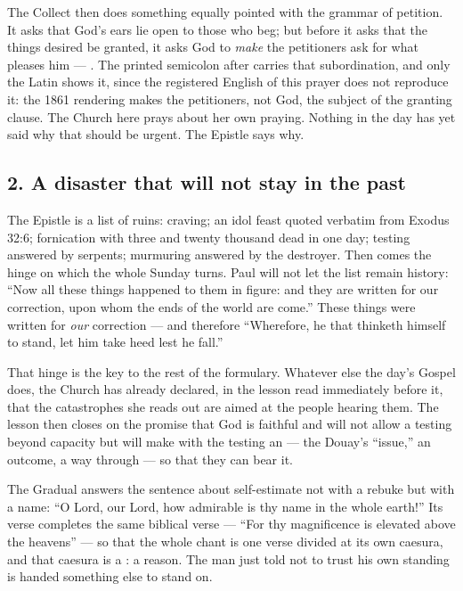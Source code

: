 The Collect then does something equally pointed with the grammar of
petition. It asks that God's ears lie open to those who beg; but before it
asks that the things desired be granted, it asks God to \textit{make} the
petitioners ask for what pleases him --- . The printed semicolon after  carries that
subordination, and only the Latin shows it, since the registered English of
this prayer does not reproduce it: the 1861 rendering makes the petitioners,
not God, the subject of the granting clause. The Church here prays about her own praying. Nothing
in the day has yet said why that should be urgent. The Epistle says why.

\subsection*{2. A disaster that will not stay in the past}

The Epistle is a list of ruins: craving; an idol feast quoted verbatim from
Exodus 32:6; fornication with three and twenty thousand dead in one day;
testing answered by serpents; murmuring answered by the destroyer. Then comes
the hinge on which the whole Sunday turns. Paul will not let the list remain
history: ``Now all these things happened to them in figure: and they are
written for our correction, upon whom the ends of the world are come.'' These
things were written for \textit{our} correction --- and therefore
``Wherefore, he that thinketh himself to stand, let him take heed lest he
fall.''

That hinge is the key to the rest of the formulary. Whatever else
the day's Gospel does, the Church has already declared, in the lesson read
immediately before it, that the catastrophes she reads out are aimed at the
people hearing them. The lesson then closes on the promise that God is
faithful and will not allow a testing beyond capacity but will make with the
testing an  --- the Douay's ``issue,'' an outcome, a way
through --- so that they can bear it.

The Gradual answers the sentence about self-estimate not with a rebuke but
with a name: ``O Lord, our Lord, how admirable is thy name in the whole
earth!'' Its verse completes the same biblical verse --- ``For thy
magnificence is elevated above the heavens'' --- so that the whole chant is
one verse divided at its own caesura, and that caesura is a : a
reason. The man just told not to trust his own standing is handed something
else to stand on.

